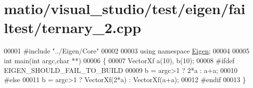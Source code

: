 \hypertarget{matio_2visual__studio_2test_2eigen_2failtest_2ternary__2_8cpp_source}{}\section{matio/visual\+\_\+studio/test/eigen/failtest/ternary\+\_\+2.cpp}
\label{matio_2visual__studio_2test_2eigen_2failtest_2ternary__2_8cpp_source}

\begin{DoxyCode}
00001 \textcolor{preprocessor}{#include "../Eigen/Core"}
00002 
00003 \textcolor{keyword}{using namespace }\hyperlink{namespace_eigen}{Eigen};
00004 
00005 \textcolor{keywordtype}{int} main(\textcolor{keywordtype}{int} argc,\textcolor{keywordtype}{char} **)
00006 \{
00007   VectorXf a(10), b(10);
00008 \textcolor{preprocessor}{#ifdef EIGEN\_SHOULD\_FAIL\_TO\_BUILD}
00009   b = argc>1 ? 2*a : a+a;
00010 \textcolor{preprocessor}{#else}
00011   b = argc>1 ? VectorXf(2*a) : VectorXf(a+a);
00012 \textcolor{preprocessor}{#endif}
00013 \}
\end{DoxyCode}
